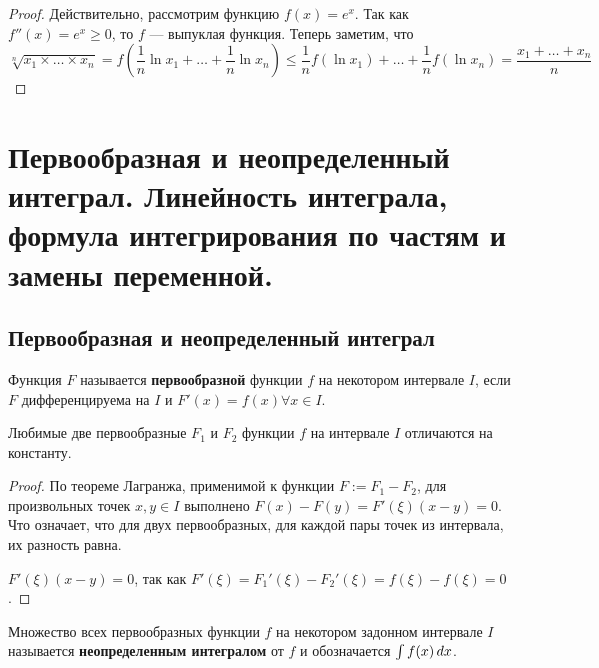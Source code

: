 \documentclass[a4paper]{article}
\theoremstyle{named}
\renewcommand{\int}{\intop}
\begin{document}
        \begin{proof}
            Действительно, рассмотрим функцию $f(x) = e^x$. Так как $f''(x) = e^x \geq 0$, то $f$ --- выпуклая функция. Теперь заметим, что
            \begin{equation*}
                \sqrt[n]{x_1 \times \dots \times x_n} = f \left(\dfrac{1}{n} \ln x_1 + \dots + \dfrac{1}{n} \ln x_n \right) \leq \dfrac{1}{n} f(\ln x_1) + \dots + \dfrac{1}{n}f(\ln x_n) = \dfrac{x_1 + \dots + x_n}{n}
            \end{equation*}
        \end{proof}


    \section{Первообразная и неопределенный интеграл. Линейность интеграла, формула интегрирования по частям и замены переменной.}

        \subsection{Первообразная и неопределенный интеграл}

        \begin{definition*}
            Функция $F$ называется \textbf{первообразной} функции $f$ на некотором интервале $I$, если $F$ дифференцируема на $I$ и $F'(x) = f(x) \forall x \in I$.
        \end{definition*}

        \begin{lemma*}
            Любимые две первообразные $F_1$ и $F_2$ функции $f$ на интервале $I$ отличаются на константу.
        \end{lemma*}

        \begin{proof}
            По теореме Лагранжа, применимой к функции $F := F_1 - F_2$, для произвольных точек $x, y \in I$ выполнено $F(x) - F(y) = F'(\xi)(x - y) = 0$. Что означает, что для двух первообразных, для каждой пары точек из интервала, их разность равна. 

            $F'(\xi)(x - y) = 0$, так как $F'(\xi) = F_1'(\xi) - F_2'(\xi) = f(\xi) - f(\xi) = 0$.
        \end{proof}

        \begin{definition*}
            Множество всех первообразных функции $f$ на некотором задонном интервале $I$ называется \textbf{неопределенным интегралом} от $f$ и обозначается $\int f(x) \dd x$.
        \end{definition*}
\end{document}
